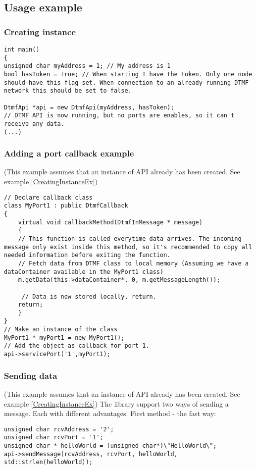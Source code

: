 \subsection{Usage example}
\subsubsection{Creating instance}
\begin{lstlisting}[float=htb,language={[ANSI]C++},caption={Creating instance example},label=CreatingInstanceEx]
int main()
{
unsigned char myAddress = 1; // My address is 1
bool hasToken = true; // When starting I have the token. Only one node should have this flag set. When connection to an already running DTMF network this should be set to false.

DtmfApi *api = new DtmfApi(myAddress, hasToken);
// DTMF API is now running, but no ports are enables, so it can't receive any data.
(...)
\end{lstlisting}

\subsubsection{Adding a port callback example}
(This example assumes that an instance of API already has been created. See example \ref{CreatingInstanceEx})
\begin{lstlisting}[float=htb,language={[ANSI]C++},caption={Adding a port callback example},label=CreatingCallbackEx]
// Declare callback class
class MyPort1 : public DtmfCallback
{
	virtual void callbackMethod(DtmfInMessage * message)
	{
    // This function is called everytime data arrives. The incoming message only exist inside this method, so it's recommended to copy all needed information before exiting the function.
    // Fetch data from DTMF class to local memory (Assuming we have a dataContainer available in the MyPort1 class)
    m.getData(this->dataContainer*, 0, m.getMessageLength());
    
     // Data is now stored locally, return.
    return;
	}
}
// Make an instance of the class
MyPort1 * myPort1 = new MyPort1();
// Add the object as callback for port 1.
api->servicePort('1',myPort1);
\end{lstlisting}


\subsubsection{Sending data}
(This example assumes that an instance of API already has been created. See example \ref{CreatingInstanceEx})
The library support two ways of sending a message. Each with different advantages.
First method - the fast way:
\begin{lstlisting}[float=htb,language={[ANSI]C++},caption={Sending data example 1},label=SendingDataEx1]
unsigned char rcvAddress = '2';
unsigned char rcvPort = '1';
unsigned char * helloWorld = (unsigned char*)\"HelloWorld\";
api->sendMessage(rcvAddress, rcvPort, helloWorld, std::strlen(helloWorld));
\end{lstlisting}

